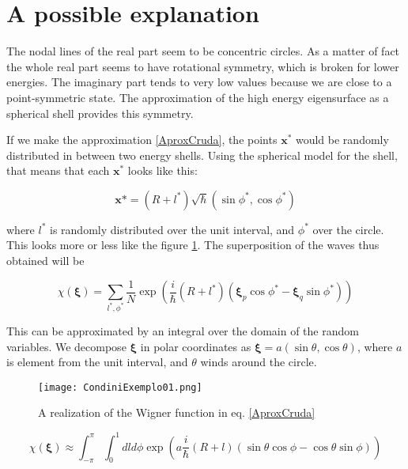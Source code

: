 \documentclass[a4paper,10pt]{article}
\newcommand{\ihb}{\frac{i}{\hbar}}
\newcommand{\xfase}{\mathbf{x}}
\newcommand{\xifase}{ {\boldsymbol{\xi}} }
\begin{document}
\section{A possible explanation}

The nodal lines of the real part seem to be concentric circles. As a matter
of fact the whole real part seems to have rotational symmetry, which
is broken for lower energies. The imaginary part tends to very low values
because we are close to a point-symmetric state. The approximation of
the high energy eigensurface as a spherical shell provides this symmetry.


If we make the approximation \ref{AproxCruda}, the points $\xfase^*$
would be randomly  distributed in between two energy shells. Using the
spherical model for the shell, that means that each $\xfase^*$ looks
like this:

\begin{equation}
\xfase*=(R+l^*)\sqrt{\hbar}(\sin \phi^*, \cos\phi^*)
\end{equation}

where $l^*$ is randomly distributed over the unit interval,
and $\phi^*$ over the circle.
This looks more or less like the figure \ref{WigExample}.
The superposition of the waves thus obtained will be

\begin{equation}
\chi(\xifase)=\sum_{l^*,\phi^*}\frac{1}{N}
 \exp \left( \ihb(R+l^*) 
(\xifase_p \cos\phi^*- \xifase_q \sin\phi^* ) \right)
\end{equation}

This can be approximated by an integral over the domain
of the random variables. We decompose $\xifase$
in polar coordinates as $\xifase=a(\sin\theta,\cos\theta)$,
where $a$ is element from the unit interval,
and $\theta$ winds around the circle.


\begin{figure}
\begin{center}
  \texttt{[image: CondiniExemplo01.png]}
\caption{ A realization of the Wigner
function in eq. \ref{AproxCruda}}\label{WigExample}
\end{center}
\end{figure}

\begin{equation}
\chi(\xifase)\approx \int_{-\pi}^\pi \int_0^1 dl d\phi
 \exp \left( a\ihb(R+l) 
(\sin\theta \cos\phi- \cos\theta \sin\phi ) 
\right)
\end{equation}
\end{document}
